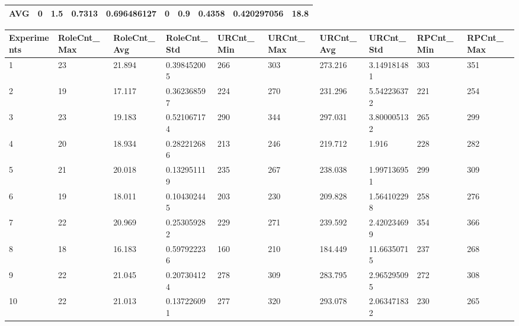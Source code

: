 \begin{table}[H]
\begin{adjustbox}{max width=360pt,keepaspectratio,angle=90}
\begin{tabular}{|l|l|l|l|l|l|l|l|l|l|}
					AVG         & 0         & 1.5       & 0.7313    & 0.696486127 & 0         & 0.9       & 0.4358    & 0.420297056 & 18.8         \\ \hline
				\end{tabular}
			\end{adjustbox}
			\begin{adjustbox}{max width=360pt,keepaspectratio,angle=90}
				\begin{tabular}{|l|l|l|l|l|l|l|l|l|l|}
					\hline
					\rowcolor[HTML]{EFEFEF} 
					Experiments & RoleCnt\_Max & RoleCnt\_Avg & RoleCnt\_Std & URCnt\_Min & URCnt\_Max & URCnt\_Avg & URCnt\_Std  & RPCnt\_Min & RPCnt\_Max \\ \hline
					1           & 23           & 21.894       & 0.398452005  & 266        & 303        & 273.216    & 3.149181481 & 303        & 351        \\ \hline
					2           & 19           & 17.117       & 0.362368597  & 224        & 270        & 231.296    & 5.542236372 & 221        & 254        \\ \hline
					3           & 23           & 19.183       & 0.521067174  & 290        & 344        & 297.031    & 3.800005132 & 265        & 299        \\ \hline
					4           & 20           & 18.934       & 0.282212686  & 213        & 246        & 219.712    & 1.916       & 228        & 282        \\ \hline
					5           & 21           & 20.018       & 0.132951119  & 235        & 267        & 238.038    & 1.997136951 & 299        & 309        \\ \hline
					6           & 19           & 18.011       & 0.104302445  & 203        & 230        & 209.828    & 1.564102298 & 258        & 276        \\ \hline
					7           & 22           & 20.969       & 0.253059282  & 229        & 271        & 239.592    & 2.420234699 & 354        & 366        \\ \hline
					8           & 18           & 16.183       & 0.597922236  & 160        & 210        & 184.449    & 11.66350715 & 237        & 268        \\ \hline
					9           & 22           & 21.045       & 0.207304124  & 278        & 309        & 283.795    & 2.965295095 & 272        & 308        \\ \hline
					10          & 22           & 21.013       & 0.137226091  & 277        & 320        & 293.078    & 2.063471832 & 230        & 265        \\ \hline

\end{tabular}
\end{adjustbox}
\end{table}

